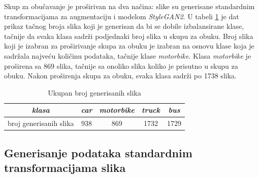 \documentclass[12pt,oneside]{memoir}
\begin{document}
Skup za obučavanje je proširivan na dva načina: slike su generisane standardnim transformacijama za augmentaciju i modelom \textit{StyleGAN2}. U tabeli \ref{tab:section4_generisaneslike} je dat prikaz tačnog broja slika koji je generisan da bi se dobile izbalansirane klase, tačnije da svaka klasa sadrži podjednaki broj slika u skupu za obuku. 
Broj slika koji je izabran za proširivanje skupa za obuku je izabran na osnovu klase koja je sadržala najveću količinu podataka, tačnije klase \textit{motorbike}. Klasa \textit{motorbike} je proširena sa 869 slika, tačnije sa onoliko slika koliko je prisutno u skupu za obuku. Nakon proširenja skupa za obuku, svaka klasa sadrži po 1738 slika.

\begin{table}[h!]
    \begin{center}
    \caption{Ukupan broj generisanih slika}\label{tab:section4_generisaneslike}
    \begin{tabular}{c|c|c|c|c}
        \textit{klasa} & \textit{car} &  \textit{motorbike} &  \textit{truck} & \textit{bus} \\ 
        \hline
        broj generisanih slika & 938 & 869 & 1732 & 1729 \\ 
    \end{tabular}
    \end{center}
\end{table}

\subsection{Generisanje podataka standardnim transformacijama slika}
\end{document}

